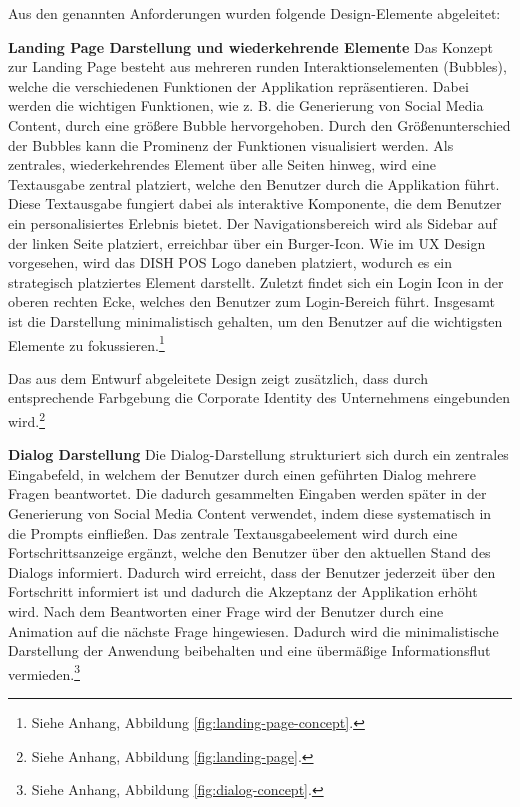 Aus den genannten Anforderungen wurden folgende Design-Elemente abgeleitet:

\textbf{Landing Page Darstellung und wiederkehrende Elemente}\newline
Das Konzept zur Landing Page besteht aus mehreren runden Interaktionselementen (Bubbles), welche die verschiedenen Funktionen der Applikation repräsentieren.
Dabei werden die wichtigen Funktionen, wie z. B. die Generierung von Social Media Content, durch eine größere Bubble hervorgehoben.
Durch den Größenunterschied der Bubbles kann die Prominenz der Funktionen visualisiert werden.
Als zentrales, wiederkehrendes Element über alle Seiten hinweg, wird eine Textausgabe zentral platziert, welche den Benutzer durch die Applikation führt.
Diese Textausgabe fungiert dabei als interaktive Komponente, die dem Benutzer ein personalisiertes Erlebnis bietet.
Der Navigationsbereich wird als Sidebar auf der linken Seite platziert, erreichbar über ein Burger-Icon.
Wie im UX Design vorgesehen, wird das DISH POS Logo daneben platziert, wodurch es ein strategisch platziertes Element darstellt.
Zuletzt findet sich ein Login Icon in der oberen rechten Ecke, welches den Benutzer zum Login-Bereich führt.
Insgesamt ist die Darstellung minimalistisch gehalten, um den Benutzer auf die wichtigsten Elemente zu fokussieren.\footnote{Siehe Anhang, Abbildung \ref{fig:landing-page-concept}.}

Das aus dem Entwurf abgeleitete Design zeigt zusätzlich, dass durch entsprechende Farbgebung die Corporate Identity des Unternehmens eingebunden wird.\footnote{Siehe Anhang, Abbildung \ref{fig:landing-page}.}

\textbf{Dialog Darstellung}\newline
Die Dialog-Darstellung strukturiert sich durch ein zentrales Eingabefeld, in welchem der Benutzer durch einen geführten Dialog mehrere Fragen beantwortet.
Die dadurch gesammelten Eingaben werden später in der Generierung von Social Media Content verwendet, indem diese systematisch in die Prompts einfließen.
Das zentrale Textausgabeelement wird durch eine Fortschrittsanzeige ergänzt, welche den Benutzer über den aktuellen Stand des Dialogs informiert.
Dadurch wird erreicht, dass der Benutzer jederzeit über den Fortschritt informiert ist und dadurch die Akzeptanz der Applikation erhöht wird.
Nach dem Beantworten einer Frage wird der Benutzer durch eine Animation auf die nächste Frage hingewiesen.
Dadurch wird die minimalistische Darstellung der Anwendung beibehalten und eine übermäßige Informationsflut vermieden.\footnote{Siehe Anhang, Abbildung \ref{fig:dialog-concept}.}

